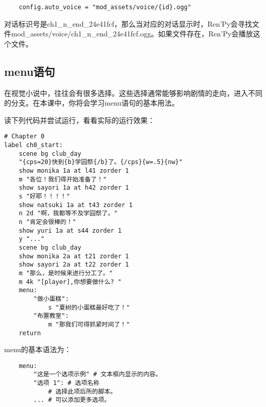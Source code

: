 \begin{lstlisting}
    config.auto_voice = "mod_assets/voice/{id}.ogg"
\end{lstlisting}

对话标识号是ch1\_n\_end\_24e41fcf，那么当对应的对话显示时，Ren'Py会寻找文件mod\_assets/voice/ch1\_n\_end\_24e41fcf.ogg。如果文件存在，Ren'Py会播放这个文件。

\subsection{menu语句}
在视觉小说中，往往会有很多选择。这些选择通常能够影响剧情的走向，进入不同的分支。在本课中，你将会学习menu语句的基本用法。

读下列代码并尝试运行，看看实际的运行效果：
\begin{lstlisting}[caption=script-ch1.rpy]
# Chapter 0
label ch0_start:
    scene bg club_day
    "{cps=20}快到{b}学园祭{/b}了。{/cps}{w=.5}{nw}"
    show monika 1a at l41 zorder 1
    m "各位！我们得开始准备了！"
    show sayori 1a at h42 zorder 1
    s "好耶！！！！"
    show natsuki 1a at t43 zorder 1
    n 2d "啊，我都等不及学园祭了。"
    n "肯定会很棒的！"
    show yuri 1a at s44 zorder 1
    y "..."
    scene bg club_day
    show monika 2a at t21 zorder 1
    show sayori 2a at t22 zorder 1
    m "那么，是时候来进行分工了。"
    m 4k "[player],你想要做什么? "
    menu:
        "做小蛋糕":
            s "夏树的小蛋糕最好吃了！"
        "布置教室":
            m "那我们可得抓紧时间了！"
    return
\end{lstlisting}

menu的基本语法为：
\begin{lstlisting}
    menu:
        "这是一个选项示例" # 文本框内显示的内容。
        "选项 1": # 选项名称
            # 选择此项后所的脚本。
        ... # 可以添加更多选项。
\end{lstlisting}
